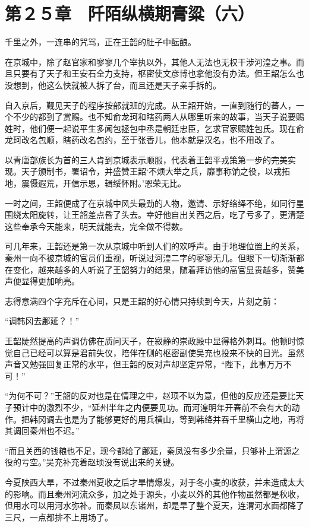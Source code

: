 \section{第２５章　阡陌纵横期膏粱（六）}

千里之外，一连串的咒骂，正在王韶的肚子中酝酿。

在京城中，除了赵官家和寥寥几个宰执以外，其他人无法也无权干涉河湟之事。而且只要有了天子和王安石全力支持，枢密使文彦博也拿他没有办法。但王韶怎么也没想到，他这么快就被人拆了台，而且还是天子亲手拆的。

自入京后，觐见天子的程序按部就班的完成。从王韶开始，一直到随行的蕃人，一个不少的都到了赏赐。也不知俞龙珂和瞎药两人从哪里听来的故事，当天子说要赐姓时，他们便一起说平生多闻包拯包中丞是朝廷忠臣，乞求官家赐姓包氏。现在俞龙珂改名包顺，瞎药改名包约，至于张香儿，他本就是汉名，也不用改了。

以青唐部族长为首的三人肯到京城表示顺服，代表着王韶平戎策第一步的完美实现。天子颁制书，署诏令，并盛赞王韶‘不烦大举之兵，靡事称饷之役，以戎拓地，震慑遐荒，开信示恩，辑绥怀附。’恩荣无比。

一时之间，王韶便成了在京城中风头最劲的人物，邀请、示好络绎不绝，如同行星围绕太阳旋转，让王韶差点昏了头去。幸好他自出关西之后，吃了亏多了，更清楚这些奉承今天能来，明天就能去，完全做不得数。

可几年来，王韶还是第一次从京城中听到人们的欢呼声。由于地理位置上的关系，秦州一向不被京城的官员们重视，听说过河湟二字的寥寥无几。但眼下一切渐渐都在变化，越来越多的人听说了王韶努力的结果，随着拜访他的高官显贵越多，赞美声便显得更加响亮。

志得意满四个字充斥在心间，只是王韶的好心情只持续到今天，片刻之前：

“调韩冈去鄜延？！”

王韶陡然提高的声调仿佛在质问天子，在寂静的崇政殿中显得格外刺耳。他顿时惊觉自己已经可以算是君前失仪，陪伴在侧的枢密副使吴充也投来不快的目光。虽然声音又勉强回复正常的水平，但王韶的反对声却坚定异常，“陛下，此事万万不可！”

“为何不可？”王韶的反对也是在情理之中，赵顼不以为意，但他的反应还是要比天子预计中的激烈不少，“延州半年之内便要见功。而河湟明年开春前不会有大的动作。把韩冈调去也是为了能够更好的用兵横山，等到韩绛并吞千里横山之地，再将其调回秦州也不迟。”

“而且关西的钱粮也不足，现今都给了鄜延，秦凤没有多少余量，只够补上渭源之役的亏空。”吴充补充着赵顼没有说出来的关键。

今夏陕西大旱，不过秦州夏收之后才旱情爆发，对于冬小麦的收获，并未造成太大的影响。而且秦州河流众多，加之处于源头，小麦以外的其他作物虽然都是秋收，但用水可以用河水弥补。而秦凤以东诸州，却是旱了整个夏天，连渭河水面都降了三尺，一点都排不上用场了。

